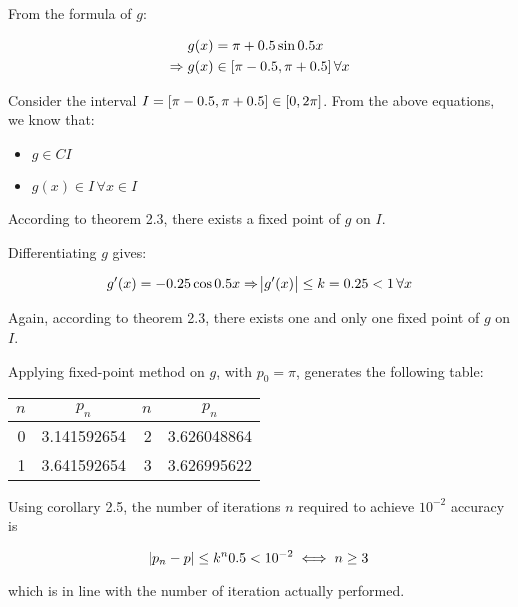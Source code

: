 \documentclass[../../../../Assignments]{subfiles}
\begin{document}
\begin{solution}
    From the formula of \(g\):

    \[\begin{aligned}
                    g(x) & = \pi + \num{0.5} \sin{\num{0.5} x} \\
        \Rightarrow g(x) & \in \interval{\pi - \num{0.5}}{\pi + \num{0.5}} \, \forall x
    \end{aligned}\]

    Consider the interval \(I = \interval{\pi - \num{0.5}}{\pi + \num{0.5}} \in
    \interval{0}{2 \pi}\). From the above equations, we know that:

    \begin{itemize}
        \item \(g \in C I\)
        \item \(g(x) \in I \, \forall x \in I\)
    \end{itemize}

    According to theorem 2.3, there exists a fixed point of \(g\) on \(I\).

    Differentiating \(g\) gives:

    \[g'(x) = -\num{0.25} \cos{\num{0.5} x} \Rightarrow \abs{g'(x)} \leq k = \num{0.25} < 1 \, \forall x\]

    Again, according to theorem 2.3, there exists one and only one fixed point
    of \(g\) on \(I\).

    Applying fixed-point method on \(g\), with \(p_0 = \pi\), generates the
    following table:

    \begin{table}[H]
        \centering
        \begin{tabular}{r S[table-format=1.9] r S[table-format=1.9]}
            \toprule
            \(n\)  &   {\(p_n\)}   &  \(n\)  &   {\(p_n\)}   \\
              &  3.141592654  &      2  &  3.626048864  \\
                1  &  3.641592654  &      3  &  3.626995622  \\
            \bottomrule
        \end{tabular}
    \end{table}

    Using corollary 2.5, the number of iterations \(n\) required to achieve
    \(10^{-2}\) accuracy is

    \[\abs{p_n - p} \leq k^n \num{0.5} < 10^{-2} \iff n \geq 3\]

    \noindent which is in line with the number of iteration actually performed.
\end{solution}
\end{document}
